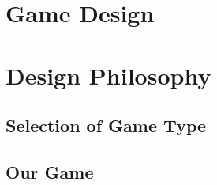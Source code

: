 \chapter{Game Design}
\chapter{Design Philosophy}


\section{Selection of Game Type}


\section{Our Game}
